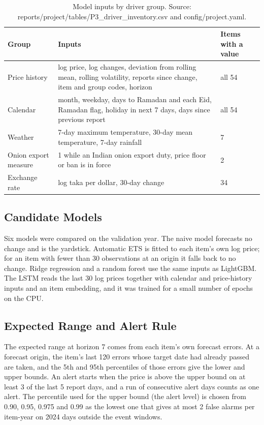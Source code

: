 \documentclass[12pt]{report}
\begin{document}
\begin{table}[H]\centering\small
\caption{Model inputs by driver group. Source: reports/project/tables/P3\_driver\_inventory.csv and config/project.yaml.}\label{tab:features}
\begin{tabular}{|p{3cm}|p{7cm}|p{2.5cm}|}
\hline
\textbf{Group} & \textbf{Inputs} & \textbf{Items with a value} \\
\hline
Price history & log price, log changes, deviation from rolling mean, rolling volatility, reports since change, item and group codes, horizon & all 54 \\
\hline
Calendar & month, weekday, days to Ramadan and each Eid, Ramadan flag, holiday in next 7 days, days since previous report & all 54 \\
\hline
Weather & 7-day maximum temperature, 30-day mean temperature, 7-day rainfall & 7 \\
\hline
Onion export measure & 1 while an Indian onion export duty, price floor or ban is in force & 2 \\
\hline
Exchange rate & log taka per dollar, 30-day change & 34 \\
\hline
\end{tabular}
\end{table}

\subsection{Candidate Models}
Six models were compared on the validation year. The naive model forecasts no change and is the yardstick. Automatic ETS is fitted to each item's own log price; for an item with fewer than 30 observations at an origin it falls back to no change. Ridge regression and a random forest use the same inputs as LightGBM. The LSTM reads the last 30 log prices together with calendar and price-history inputs and an item embedding, and it was trained for a small number of epochs on the CPU.

\subsection{Expected Range and Alert Rule}
The expected range at horizon 7 comes from each item's own forecast errors. At a forecast origin, the item's last 120 errors whose target date had already passed are taken, and the 5th and 95th percentiles of those errors give the lower and upper bounds. An alert starts when the price is above the upper bound on at least 3 of the last 5 report days, and a run of consecutive alert days counts as one alert. The percentile used for the upper bound (the alert level) is chosen from 0.90, 0.95, 0.975 and 0.99 as the lowest one that gives at most 2 false alarms per item-year on 2024 days outside the event windows.
\end{document}
